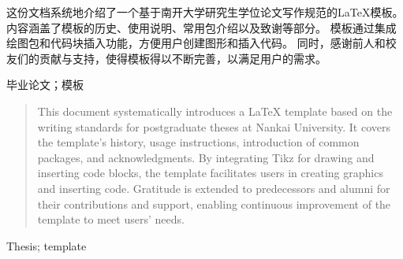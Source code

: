 

\begin{zhaiyao}

    这份文档系统地介绍了一个基于南开大学研究生学位论文写作规范的LaTeX模板。
    内容涵盖了模板的历史、使用说明、常用包介绍以及致谢等部分。
    模板通过集成绘图包和代码块插入功能，方便用户创建图形和插入代码。
    同时，感谢前人和校友们的贡献与支持，使得模板得以不断完善，以满足用户的需求。

\end{zhaiyao}




\begin{guanjianci}
    毕业论文；模板
\end{guanjianci}



\begin{abstract}


    This document systematically introduces a LaTeX template based on the writing standards for postgraduate theses at Nankai University.
    It covers the template's history, usage instructions, introduction of common packages, and acknowledgments.
    By integrating Tikz for drawing and inserting code blocks, the template facilitates users in creating graphics and inserting code. 
    Gratitude is extended to predecessors and alumni for their contributions and support, enabling continuous improvement of the template to meet users' needs.

\end{abstract}



\begin{keywords}
    Thesis; template
\end{keywords}